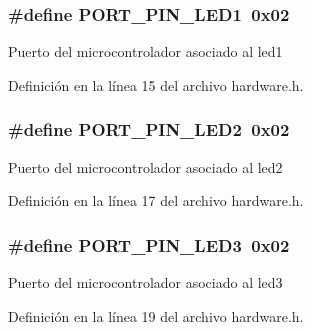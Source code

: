 \subsubsection[{\texorpdfstring{P\+O\+R\+T\+\_\+\+P\+I\+N\+\_\+\+L\+E\+D1}{PORT_PIN_LED1}}]{\setlength{\rightskip}{0pt plus 5cm}\#define P\+O\+R\+T\+\_\+\+P\+I\+N\+\_\+\+L\+E\+D1~0x02}\hypertarget{group__hardware_ga281151e2a661c8ad6893aee42b0024c4}{}\label{group__hardware_ga281151e2a661c8ad6893aee42b0024c4}
Puerto del microcontrolador asociado al led1 

Definición en la línea 15 del archivo hardware.\+h.

\subsubsection[{\texorpdfstring{P\+O\+R\+T\+\_\+\+P\+I\+N\+\_\+\+L\+E\+D2}{PORT_PIN_LED2}}]{\setlength{\rightskip}{0pt plus 5cm}\#define P\+O\+R\+T\+\_\+\+P\+I\+N\+\_\+\+L\+E\+D2~0x02}\hypertarget{group__hardware_ga3039da47774de5edf9a11968103d87c5}{}\label{group__hardware_ga3039da47774de5edf9a11968103d87c5}
Puerto del microcontrolador asociado al led2 

Definición en la línea 17 del archivo hardware.\+h.

\subsubsection[{\texorpdfstring{P\+O\+R\+T\+\_\+\+P\+I\+N\+\_\+\+L\+E\+D3}{PORT_PIN_LED3}}]{\setlength{\rightskip}{0pt plus 5cm}\#define P\+O\+R\+T\+\_\+\+P\+I\+N\+\_\+\+L\+E\+D3~0x02}\hypertarget{group__hardware_ga097e347296860c96d104ef8ab90dac33}{}\label{group__hardware_ga097e347296860c96d104ef8ab90dac33}
Puerto del microcontrolador asociado al led3 

Definición en la línea 19 del archivo hardware.\+h.

